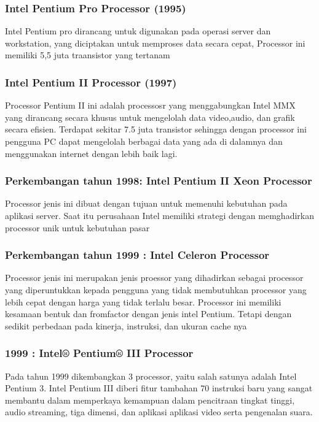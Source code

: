  			\subsubsection{Intel Pentium Pro Processor (1995)}
 	Intel Pentium pro dirancang untuk digunakan pada operasi server dan workstation, yang diciptakan untuk memproses data secara cepat, Processor ini memiliki 5,5 juta traansistor yang tertanam
 			\subsubsection{Intel Pentium II Processor (1997)}	
 	Processor Pentium II ini adalah processosr yang menggabungkan Intel MMX yang dirancang secara khusus untuk mengelolah data video,audio, dan grafik secara efisien. Terdapat sekitar 7.5 juta transistor sehingga dengan processor ini pengguna PC dapat mengelolah berbagai data yang ada di dalamnya dan menggunakan internet dengan lebih baik lagi.


 			\subsubsection{Perkembangan tahun 1998: Intel Pentium II Xeon Processor}
 	Processor jenis ini dibuat dengan tujuan untuk memenuhi kebutuhan pada aplikasi server. Saat itu perusahaan Intel memiliki strategi dengan memghadirkan processor unik untuk kebutuhan pasar
 			\subsubsection{Perkembangan tahun 1999 : Intel Celeron Processor}
 	Processor jenis ini merupakan jenis proessor yang dihadirkan sebagai processor yang diperuntukkan kepada pengguna yang tidak membutuhkan processor yang lebih cepat dengan harga yang tidak terlalu besar. Processor ini memiliki kesamaan bentuk dan fromfactor dengan jenis intel Pentium. Tetapi dengan sedikit perbedaan pada kinerja, instruksi, dan ukuran cache nya


 			\subsubsection{1999 : Intel® Pentium® III Processor}
 	Pada tahun 1999 dikembangkan 3 processor, yaitu salah satunya adalah Intel Pentium 3. Intel Pentium III diberi fitur tambahan 70 instruksi baru yang sangat membantu dalam memperkaya kemampuan dalam pencitraan tingkat tinggi, audio streaming, tiga dimensi, dan aplikasi aplikasi video serta pengenalan suara. 

